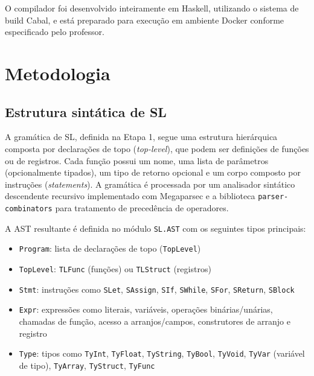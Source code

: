 \documentclass[12pt,a4paper]{article}
\begin{document}
O compilador foi desenvolvido inteiramente em Haskell, utilizando o sistema de build Cabal, e está preparado para execução em ambiente Docker conforme especificado pelo professor.

\section{Metodologia}

\subsection{Estrutura sintática de SL}

A gramática de SL, definida na Etapa 1, segue uma estrutura hierárquica composta por declarações de topo (\textit{top-level}), que podem ser definições de funções ou de registros. Cada função possui um nome, uma lista de parâmetros (opcionalmente tipados), um tipo de retorno opcional e um corpo composto por instruções (\textit{statements}). A gramática é processada por um analisador sintático descendente recursivo implementado com Megaparsec e a biblioteca \texttt{parser-combinators} para tratamento de precedência de operadores.

A AST resultante é definida no módulo \texttt{SL.AST} com os seguintes tipos principais:

\begin{itemize}
    \item \texttt{Program}: lista de declarações de topo (\texttt{TopLevel})
    \item \texttt{TopLevel}: \texttt{TLFunc} (funções) ou \texttt{TLStruct} (registros)
    \item \texttt{Stmt}: instruções como \texttt{SLet}, \texttt{SAssign}, \texttt{SIf}, \texttt{SWhile}, \texttt{SFor}, \texttt{SReturn}, \texttt{SBlock}
    \item \texttt{Expr}: expressões como literais, variáveis, operações binárias/unárias, chamadas de função, acesso a arranjos/campos, construtores de arranjo e registro
    \item \texttt{Type}: tipos como \texttt{TyInt}, \texttt{TyFloat}, \texttt{TyString}, \texttt{TyBool}, \texttt{TyVoid}, \texttt{TyVar} (variável de tipo), \texttt{TyArray}, \texttt{TyStruct}, \texttt{TyFunc}
\end{itemize}

\end{document}
